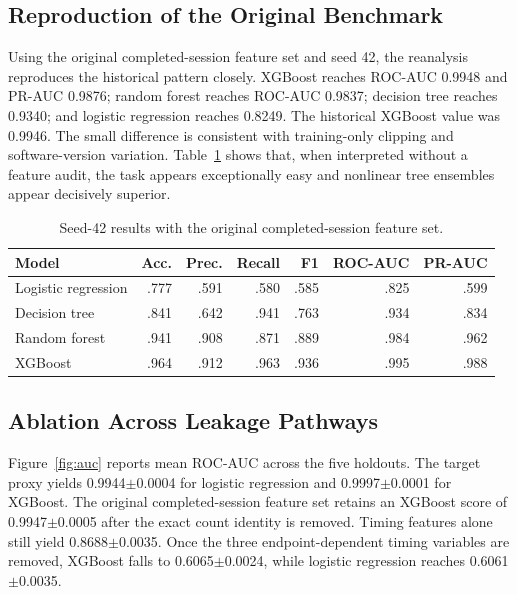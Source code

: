 \documentclass[conference, letterpaper]{IEEEtran}
\begin{document}
\subsection{Reproduction of the Original Benchmark}
Using the original completed-session feature set and seed 42, the reanalysis reproduces the historical pattern closely. XGBoost reaches ROC-AUC 0.9948 and PR-AUC 0.9876; random forest reaches ROC-AUC 0.9837; decision tree reaches 0.9340; and logistic regression reaches 0.8249. The historical XGBoost value was 0.9946. The small difference is consistent with training-only clipping and software-version variation. Table~\ref{tab:original} shows that, when interpreted without a feature audit, the task appears exceptionally easy and nonlinear tree ensembles appear decisively superior.
\begin{table}[t]
\caption{Seed-42 results with the original completed-session feature set.}
\label{tab:original}
\centering
\scriptsize
\begin{tabular}{lrrrrrr}
\toprule
Model & Acc. & Prec. & Recall & F1 & ROC-AUC & PR-AUC \\
\midrule
Logistic regression & .777 & .591 & .580 & .585 & .825 & .599 \\
Decision tree & .841 & .642 & .941 & .763 & .934 & .834 \\
Random forest & .941 & .908 & .871 & .889 & .984 & .962 \\
XGBoost & .964 & .912 & .963 & .936 & .995 & .988 \\
\bottomrule
\end{tabular}
\end{table}

\subsection{Ablation Across Leakage Pathways}
Figure~\ref{fig:auc} reports mean ROC-AUC across the five holdouts. The target proxy yields 0.9944$\pm$0.0004 for logistic regression and 0.9997$\pm$0.0001 for XGBoost. The original completed-session feature set retains an XGBoost score of 0.9947$\pm$0.0005 after the exact count identity is removed. Timing features alone still yield 0.8688$\pm$0.0035. Once the three endpoint-dependent timing variables are removed, XGBoost falls to 0.6065$\pm$0.0024, while logistic regression reaches 0.6061$\pm$0.0035.
\end{document}

